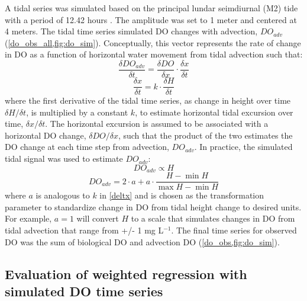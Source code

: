 \documentclass[letterpaper,12pt,oneside]{article}\usepackage[]{graphicx}\usepackage[]{color}
\begin{document}
A tidal series was simulated based on the principal lundar seimdiurnal (M2) tide with a period of 12.42 hours \citep{Foreman89}.  The amplitude was set to 1 meter and centered  at 4 meters.  The tidal time series simulated \ac{DO} changes with advection, $DO_{adv}$ (\cref{do_obs_all,fig:do_sim}). Conceptually, this vector represents the rate of change in \ac{DO} as a function of horizontal water movement from tidal advection such that:
\begin{equation} \label{deltdo}
\frac{\delta DO_{adv}}{\delta t} = \frac{\delta DO}{\delta x} \cdot \frac{\delta x}{\delta t}
\end{equation}
\begin{equation} \label{deltx}
\frac{\delta x}{\delta t} = k \cdot \frac{\delta H}{\delta t}
\end{equation}
where the first derivative of the tidal time series, as change in height over time $\delta H / \delta t$, is multiplied by a constant $k$, to estimate horizontal tidal excursion over time, $\delta x / \delta t$.  The horizontal excursion is assumed to be associated with a horizontal \ac{DO} change, $\delta DO / \delta x$, such that the product of the two estimates the \ac{DO} change at each time step from advection, $DO_{adv}$. In practice, the simulated tidal signal was used to estimate $DO_{adv}$:
\begin{equation} \label{do_advp}
DO_{adv} \propto H
\end{equation}
\begin{equation} \label{do_adv}
DO_{adv} = 2\cdot a + a \cdot \frac{H- \min H}{\max H - \min H}
\end{equation}
where $a$ is analogous to $k$ in \cref{deltx} and is chosen as the transformation parameter to standardize change in \ac{DO} from tidal height change to desired units.  For example, $a = 1$ will convert $H$ to a scale that simulates changes in \ac{DO} from tidal advection that range from +/- 1 mg L$^{-1}$.  The final time series for observed \ac{DO} was the sum of biological \ac{DO} and advection \ac{DO} (\cref{do_obs,fig:do_sim}).

\subsection{Evaluation of weighted regression with simulated \ac{DO} time series}
\end{document}
